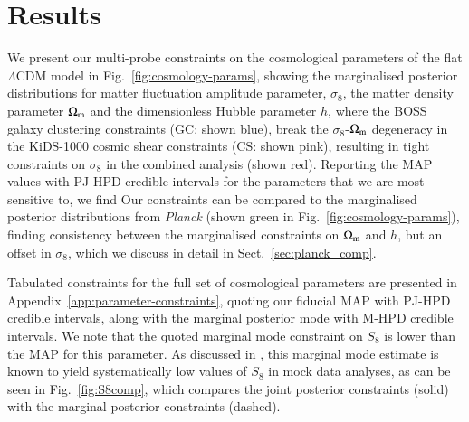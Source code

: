 \section{Results}
\label{sec:results}
We present our multi-probe constraints on the cosmological parameters of the flat $\Lambda$CDM model in Fig.~\ref{fig:cosmology-params}, showing the marginalised posterior distributions for matter fluctuation amplitude parameter, $\sigma_8$, the matter density parameter $\Omega_{\rm m}$ and the dimensionless Hubble parameter $h$, where the BOSS galaxy clustering constraints (GC: shown blue), break the $\sigma_8$-$\Omega_{\rm m}$ degeneracy in the KiDS-1000 cosmic shear constraints (CS: shown pink), resulting in tight constraints on $\sigma_8$ in the combined \tttp analysis (shown red). 
Reporting the MAP values with PJ-HPD credible intervals for the parameters that we are most sensitive to, we find 
Our constraints can be compared to the marginalised posterior distributions from {\it Planck} (shown green in Fig.~\ref{fig:cosmology-params}), finding consistency between the marginalised constraints on $\Omega_{\rm m}$ and $h$, but an offset in $\sigma_8$,  which we discuss in detail in Sect.~\ref{sec:planck_comp}.

Tabulated constraints for the full set of cosmological parameters are presented in Appendix~\ref{app:parameter-constraints}, quoting our fiducial MAP with PJ-HPD credible intervals, along with the marginal posterior mode with M-HPD credible intervals. 
We note that the quoted marginal mode constraint on $S_8$ is \preliminary{$0.2\sigma$} lower than the MAP for this parameter. 
As discussed in \citet{joachimi/etal:inprep}, this marginal mode estimate is known to yield systematically low values of $S_8$ in mock data analyses, as can be seen in Fig.~\ref{fig:S8comp}, which compares the joint posterior constraints (solid) with the marginal posterior constraints (dashed).  


